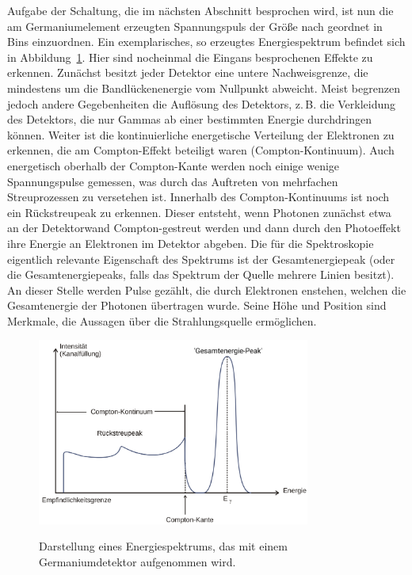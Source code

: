 Aufgabe der Schaltung, die im nächsten Abschnitt besprochen wird, ist nun die am Germaniumelement erzeugten Spannungspuls der 
Größe nach geordnet in Bins einzuordnen. Ein exemplarisches, so erzeugtes Energiespektrum befindet sich in 
Abbildung~\ref{fig: example_spectrum}. Hier sind nocheinmal die Eingans besprochenen Effekte zu erkennen. Zunächst besitzt jeder 
Detektor eine untere Nachweisgrenze, die mindestens um die Bandlückenenergie vom Nullpunkt abweicht. Meist begrenzen jedoch 
andere Gegebenheiten die Auflösung des Detektors, z.\,B. die Verkleidung des Detektors, die nur Gammas ab einer bestimmten Energie 
durchdringen können. Weiter ist die kontinuierliche energetische Verteilung der Elektronen zu erkennen, die am Compton-Effekt 
beteiligt waren (Compton-Kontinuum). Auch energetisch oberhalb der Compton-Kante werden noch einige wenige Spannungspulse gemessen,
was durch das Auftreten von mehrfachen Streuprozessen zu versetehen ist. Innerhalb des Compton-Kontinuums ist noch ein Rückstreupeak 
zu erkennen. Dieser entsteht, wenn Photonen zunächst etwa an der Detektorwand Compton-gestreut werden und dann durch den 
Photoeffekt ihre Energie an Elektronen im Detektor abgeben. 
Die für die Spektroskopie eigentlich relevante Eigenschaft des Spektrums ist der Gesamtenergiepeak (oder die Gesamtenergiepeaks, falls 
das Spektrum der Quelle mehrere Linien besitzt). An dieser Stelle werden Pulse gezählt, die durch Elektronen enstehen, welchen 
die Gesamtenergie der Photonen übertragen wurde.
Seine Höhe und Position sind Merkmale, die Aussagen über die Strahlungsquelle ermöglichen.   
\begin{figure}
\centering
\includegraphics[width = 0.8\textwidth]{pics/example_spectrum.pdf}
\label{fig: example_spectrum}
\caption{Darstellung eines Energiespektrums, das mit einem Germaniumdetektor aufgenommen wird.}
\end{figure}